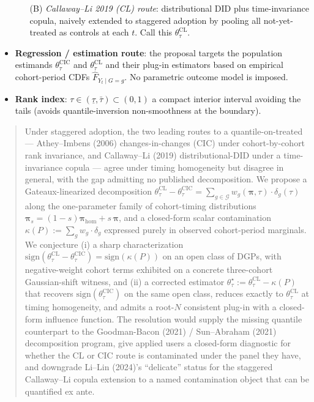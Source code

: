 \documentclass[11pt]{article}
\theoremstyle{definition}
\theoremstyle{plain}
\theoremstyle{remark}
\begin{document}
\begin{itemize}
\begin{itemize}
          \item[(B)] \emph{Callaway--Li 2019 (CL) route}: distributional DID plus time-invariance copula, naively extended to staggered adoption by pooling all not-yet-treated as controls at each $t$. Call this $\theta^{\mathrm{CL}}_\tau$.
        \end{itemize}
  \item \textbf{Regression / estimation route}: the proposal targets the population estimands $\theta^{\mathrm{CIC}}_\tau$ and $\theta^{\mathrm{CL}}_\tau$ and their plug-in estimators based on empirical cohort-period CDFs $\widehat F_{Y_t \mid G=g}$. No parametric outcome model is imposed.
  \item \textbf{Rank index}: $\tau \in (\underline\tau, \bar\tau) \subset (0,1)$ a compact interior interval avoiding the tails (avoids quantile-inversion non-smoothness at the boundary).
\end{itemize}

\begin{abstract}
Under staggered adoption, the two leading routes to a quantile-on-treated --- Athey--Imbens (2006) changes-in-changes (CIC) under cohort-by-cohort rank invariance, and Callaway--Li (2019) distributional-DID under a time-invariance copula --- agree under timing homogeneity but disagree in general, with the gap admitting no published decomposition. We propose a Gateaux-linearized decomposition $\theta^{\mathrm{CL}}_\tau - \theta^{\mathrm{CIC}}_\tau = \sum_{g \in \mathcal{G}} w_g(\boldsymbol\pi,\tau) \cdot \delta_g(\tau)$ along the one-parameter family of cohort-timing distributions $\boldsymbol\pi_s = (1-s)\boldsymbol\pi_{\mathrm{hom}} + s\,\boldsymbol\pi$, and a closed-form scalar contamination $\kappa(P) := \sum_g w_g \cdot \delta_g$ expressed purely in observed cohort-period marginals. We conjecture (i) a sharp characterization $\mathrm{sign}(\theta^{\mathrm{CL}}_\tau - \theta^{\mathrm{CIC}}_\tau) = \mathrm{sign}(\kappa(P))$ on an open class of DGPs, with negative-weight cohort terms exhibited on a concrete three-cohort Gaussian-shift witness, and (ii) a corrected estimator $\theta^\star_\tau := \theta^{\mathrm{CL}}_\tau - \kappa(P)$ that recovers $\mathrm{sign}(\theta^{\mathrm{CIC}}_\tau)$ on the same open class, reduces exactly to $\theta^{\mathrm{CL}}_\tau$ at timing homogeneity, and admits a root-$N$ consistent plug-in with a closed-form influence function. The resolution would supply the missing quantile counterpart to the Goodman-Bacon (2021) / Sun--Abraham (2021) decomposition program, give applied users a closed-form diagnostic for whether the CL or CIC route is contaminated under the panel they have, and downgrade Li--Lin (2024)'s ``delicate'' status for the staggered Callaway--Li copula extension to a named contamination object that can be quantified ex ante.
\end{abstract}
\end{document}
